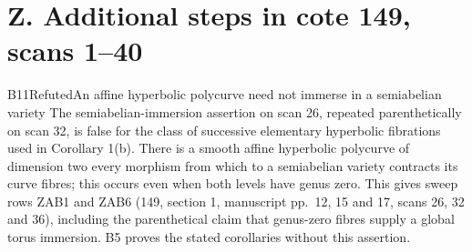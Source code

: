 \section{Z. Additional steps in cote 149, scans 1--40}

\begin{result}{B11}{Refuted}{An affine hyperbolic polycurve need not immerse in a semiabelian variety}
\label{res:B11}
The semiabelian-immersion assertion on scan 26, repeated parenthetically
on scan 32, is false for the class of successive elementary hyperbolic
fibrations used in Corollary 1(b). There is a smooth affine hyperbolic
polycurve of dimension two every morphism from which to a semiabelian
variety contracts its curve fibres; this occurs even when both levels
have genus zero. This gives sweep rows ZAB1 and ZAB6 (149, section 1,
manuscript pp.~12, 15 and 17, scans 26, 32 and 36), including the
parenthetical claim that genus-zero fibres supply a global torus immersion.
B5 proves the stated corollaries without this assertion.
\end{result}
